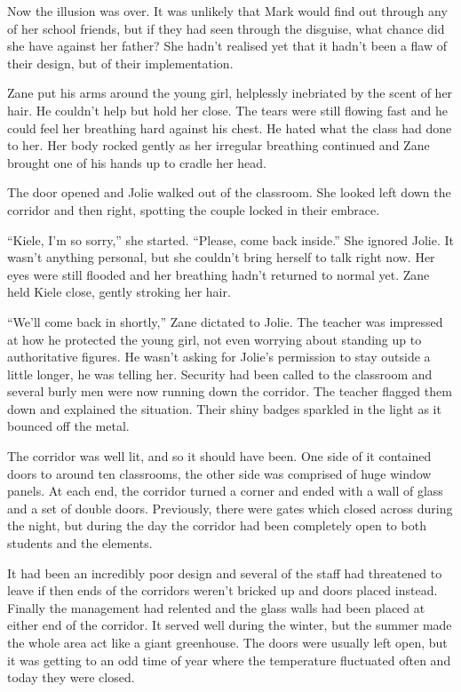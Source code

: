 Now the illusion was over.  It was unlikely that Mark would find out through any of her school friends, but if they had seen through the disguise, what chance did she have against her father?  She hadn't realised yet that it hadn't been a flaw of their design, but of their implementation.  

Zane put his arms around the young girl, helplessly inebriated by the scent of her hair.  He couldn't help but hold her close.  The tears were still flowing fast and he could feel her breathing hard against his chest.  He hated what the class had done to her.  Her body rocked gently as her irregular breathing continued and Zane brought one of his hands up to cradle her head.

The door opened and Jolie walked out of the classroom.  She looked left down the corridor and then right, spotting the couple locked in their embrace.

``Kiele, I'm so sorry,'' she started.  ``Please, come back inside.''  She ignored Jolie.  It wasn't anything personal, but she couldn't bring herself to talk right now.  Her eyes were still flooded and her breathing hadn't returned to normal yet.  Zane held Kiele close, gently stroking her hair.  

``We'll come back in shortly,'' Zane dictated to Jolie.  The teacher was impressed at how he protected the young girl, not even worrying about standing up to authoritative figures.  He wasn't asking for Jolie's permission to stay outside a little longer, he was telling her.  Security had been called to the classroom and several burly men were now running down the corridor.  The teacher flagged them down and explained the situation.  Their shiny badges sparkled in the light as it bounced off the metal.  

The corridor was well lit, and so it should have been.  One side of it contained doors to around ten classrooms, the other side was comprised of huge window panels.  At each end, the corridor turned a corner and ended with a wall of glass and a set of double doors.  Previously, there were gates which closed across during the night, but during the day the corridor had been completely open to both students and the elements.  

It had been an incredibly poor design and several of the staff had threatened to leave if then ends of the corridors weren't bricked up and doors placed instead.  Finally the management had relented and the glass walls had been placed at either end of the corridor.  It served well during the winter, but the summer made the whole area act like a giant greenhouse.  The doors were usually left open, but it was getting to an odd time of year where the temperature fluctuated often and today they were closed.

